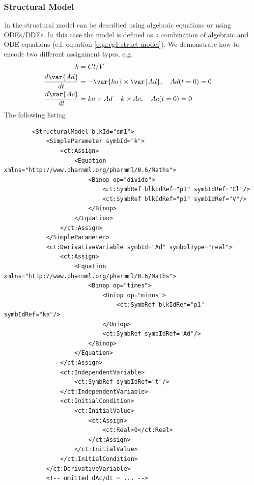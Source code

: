 \subsubsection{Structural Model}

In \pharmml the structural model can be described using algebraic
equations or using ODEs/DDEs. In this case the model is defined 
as a combination of algebraic and ODE equations (c.f.\xspace equation \ref{eqn:eg1-struct-model}).
We demonstrate how to encode two different assignment types, e.g.
\begin{align}
k & = Cl / V \nonumber \\
\frac{d \var{Ad}}{dt} 	& = -\var{ka} \times \var{Ad}, \quad Ad(t=0)=0 \nonumber \\
\frac{d \var{Ac}}{dt}	& = ka \times Ad - k \times Ac, \quad Ac(t=0)=0  \nonumber
\end{align}
The following listing 
\lstset{language=XML}
\begin{lstlisting}
        <StructuralModel blkId="sm1">
            <SimpleParameter symbId="k">
                <ct:Assign>
                    <Equation xmlns="http://www.pharmml.org/pharmml/0.6/Maths">
                        <Binop op="divide">
                            <ct:SymbRef blkIdRef="p1" symbIdRef="Cl"/>
                            <ct:SymbRef blkIdRef="p1" symbIdRef="V"/>
                        </Binop>
                    </Equation>
                </ct:Assign>
            </SimpleParameter>
            <ct:DerivativeVariable symbId="Ad" symbolType="real">
                <ct:Assign>
                    <Equation xmlns="http://www.pharmml.org/pharmml/0.6/Maths">
                        <Binop op="times">
                            <Uniop op="minus">
                                <ct:SymbRef blkIdRef="p1" symbIdRef="ka"/>
                            </Uniop>
                            <ct:SymbRef symbIdRef="Ad"/>
                        </Binop>
                    </Equation>
                </ct:Assign>
                <ct:IndependentVariable>
                    <ct:SymbRef symbIdRef="t"/>
                </ct:IndependentVariable>
                <ct:InitialCondition>
                    <ct:InitialValue>
                        <ct:Assign>
                            <ct:Real>0</ct:Real>
                        </ct:Assign>
                    </ct:InitialValue>
                </ct:InitialCondition>
            </ct:DerivativeVariable>
            <!-- omitted dAc/dt = ... --> 
\end{lstlisting}
